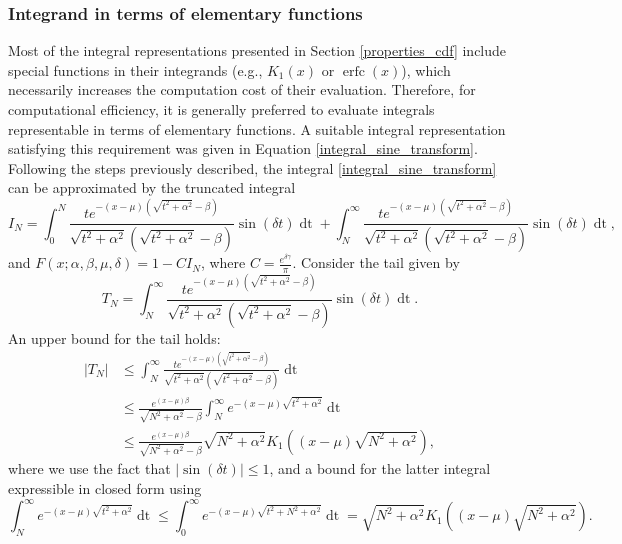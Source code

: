 \documentclass[10pt,a4paper,oneside]{article}
\DeclareMathOperator{\erfc}{erfc}
\numberwithin{equation}{section}
\begin{document}
\subsubsection{Integrand in terms of elementary functions}
Most of the integral representations presented in Section \ref{properties_cdf} include special functions in their integrands (e.g., $K_1(x)$ or $\erfc(x)$), which necessarily increases the computation cost of their evaluation. Therefore, for computational efficiency, it is generally preferred to evaluate integrals representable in terms of elementary functions. A suitable integral representation satisfying this requirement was given in Equation \eqref{integral_sine_transform}. Following the steps previously described, the integral \eqref{integral_sine_transform} can be approximated by the truncated integral 
\begin{equation}\label{truncated_integral_sine_transform}
I_N = \int_0^N \frac{t e^{-(x-\mu)\left(\sqrt{t^2 + \alpha^2} - \beta\right)}}{\sqrt{t^2 + \alpha^2}\left(\sqrt{t^2 + \alpha^2} - \beta\right)}\sin(\delta t)\mathop{dt} + \int_N^{\infty} \frac{t e^{-(x-\mu)\left(\sqrt{t^2 + \alpha^2} - \beta\right)}}{\sqrt{t^2 + \alpha^2}\left(\sqrt{t^2 + \alpha^2} - \beta\right)}\sin(\delta t)\mathop{dt},
\end{equation}
and $F(x; \alpha, \beta, \mu, \delta) = 1 - C I_N$, where $C = \frac{e^{\delta \gamma}}{\pi}$. Consider the tail given by
\begin{equation}
T_N = \int_N^{\infty} \frac{t e^{-(x-\mu)\left(\sqrt{t^2 + \alpha^2} - \beta\right)}}{\sqrt{t^2 + \alpha^2}\left(\sqrt{t^2 + \alpha^2} - \beta\right)}\sin(\delta t)\mathop{dt}.
\end{equation}
An upper bound for the tail holds:
\begin{align*}
|T_N| &\le \int_N^{\infty} \frac{t e^{-(x-\mu)\left(\sqrt{t^2 + \alpha^2} - \beta\right)}}{\sqrt{t^2 + \alpha^2}\left(\sqrt{t^2 + \alpha^2} - \beta\right)}\mathop{dt}\\
&\le \frac{e^{(x-\mu)\beta}}{\sqrt{N^2 + \alpha^2} - \beta}\int_N^{\infty} e^{-(x-\mu)\sqrt{t^2 + \alpha^2}} \mathop{dt}\\
&\le \frac{e^{(x-\mu)\beta}}{\sqrt{N^2 + \alpha^2} - \beta} \sqrt{N^2 + \alpha^2} K_1((x-\mu)\sqrt{N^2 + \alpha^2}),
\end{align*}
where we use the fact that $|\sin(\delta t)| \le 1$, and a bound for the latter integral expressible in closed form using \cite[\S 3.461]{gradshteyn2007}
\begin{equation*}
\int_N^{\infty} e^{-(x-\mu)\sqrt{t^2 + \alpha^2}} \mathop{dt} \le \int_0^{\infty} e^{-(x-\mu)\sqrt{t^2 + N^2 + \alpha^2}} \mathop{dt} = \sqrt{N^2 + \alpha^2} K_1((x-\mu)\sqrt{N^2 + \alpha^2}).
\end{equation*}
\end{document}
